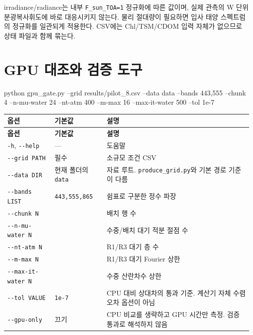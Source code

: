 irradiance/radiance는 내부 \texttt{F\_\allowbreak{}sun\_\allowbreak{}TOA=\allowbreak{}1} 정규화에 따른 값이며, 실제 관측의 W 단위 분광복사휘도에 바로 대응시키지 않는다. 물리 절대량이 필요하면 입사 태양 스펙트럼의 정규화를 일관되게 적용한다. CSV에는 Chl/TSM/CDOM 입력 자체가 없으므로 상태 파일과 함께 묶는다.

\section{GPU 대조와 검증 도구}
\label{sec:auto:06_python_batch:9}

\begin{ManualCode}
python gpu_gate.py --grid results/pilot_8.csv --data data --bands 443,555 --chunk 4 --n-mu-water 24 --nt-atm 400 --m-max 16 --max-it-water 500 --tol 1e-7
\end{ManualCode}


{\TableFont
\begin{longtable}{@{}>{\raggedright\arraybackslash}p{}>{\raggedright\arraybackslash}p{}>{\raggedright\arraybackslash}p{}@{}}
\toprule
\textbf{옵션} & \textbf{기본값} & \textbf{설명} \\
\midrule
\endfirsthead
\toprule
\textbf{옵션} & \textbf{기본값} & \textbf{설명} \\
\midrule
\endhead
\bottomrule
\endfoot
\texttt{-\allowbreak{}h}, \texttt{-\allowbreak{}-\allowbreak{}help} & --- & 도움말 \\
\texttt{-\allowbreak{}-\allowbreak{}grid PATH} & 필수 & 소규모 조건 CSV \\
\texttt{-\allowbreak{}-\allowbreak{}data DIR} & 현재 폴더의 \texttt{data} & 자료 루트. \texttt{produce\_\allowbreak{}grid.\allowbreak{}py}와 기본 경로 기준이 다름 \\
\texttt{-\allowbreak{}-\allowbreak{}bands LIST} & \texttt{443,\allowbreak{}555,\allowbreak{}865} & 쉼표로 구분한 정수 파장 \\
\texttt{-\allowbreak{}-\allowbreak{}chunk N} & 8 & 배치 행 수 \\
\texttt{-\allowbreak{}-\allowbreak{}n-\allowbreak{}mu-\allowbreak{}water N} & 24 & 수중/배치 대기 적분 절점 수 \\
\texttt{-\allowbreak{}-\allowbreak{}nt-\allowbreak{}atm N} & 400 & R1/R3 대기 층 수 \\
\texttt{-\allowbreak{}-\allowbreak{}m-\allowbreak{}max N} & 16 & R1/R3 대기 Fourier 상한 \\
\texttt{-\allowbreak{}-\allowbreak{}max-\allowbreak{}it-\allowbreak{}water N} & 500 & 수중 산란차수 상한 \\
\texttt{-\allowbreak{}-\allowbreak{}tol VALUE} & \texttt{1e-\allowbreak{}7} & CPU 대비 상대차의 통과 기준. 계산기 자체 수렴오차 옵션이 아님 \\
\texttt{-\allowbreak{}-\allowbreak{}gpu-\allowbreak{}only} & 끄기 & CPU 비교를 생략하고 GPU 시간만 측정. 검증 통과로 해석하지 않음 \\
\end{longtable}
}

